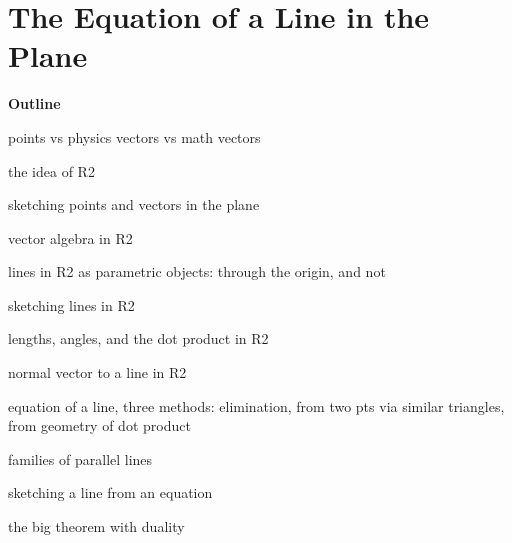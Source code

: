 \documentclass[00-livre-main.tex]{subfiles}
\begin{document}
\chapter{The Equation of a Line in the Plane}


\textbf{Outline}
\begin{compactitem}
\item points vs physics vectors vs math vectors
\item the idea of R2
\item sketching points and vectors in the plane
\item vector algebra in R2
\item lines in R2 as parametric objects: through the origin, and not
\item sketching lines in R2
\item lengths, angles, and the dot product in R2
\item normal vector to a line in R2
\item equation of a line, three methods: elimination, from two pts via similar triangles, from geometry of dot product
\item families of parallel lines
\item sketching a line from an equation
\item the big theorem with duality
\end{compactitem}
\end{document}

